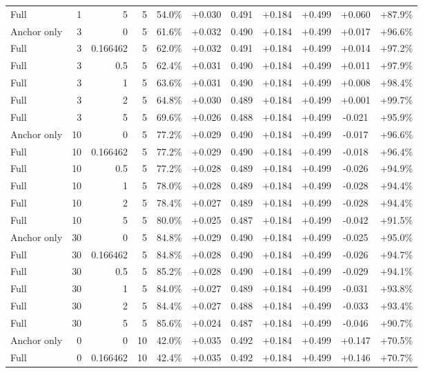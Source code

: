 \begin{table}[htbp]
\begin{tabular}{lrrrccccccc}
Full & 1 & 5 & 5 & 54.0\% & +0.030 & 0.491 & +0.184 & +0.499 & +0.060 & +87.9\% \\
Anchor only & 3 & 0 & 5 & 61.6\% & +0.032 & 0.490 & +0.184 & +0.499 & +0.017 & +96.6\% \\
Full & 3 & 0.166462 & 5 & 62.0\% & +0.032 & 0.491 & +0.184 & +0.499 & +0.014 & +97.2\% \\
Full & 3 & 0.5 & 5 & 62.4\% & +0.031 & 0.490 & +0.184 & +0.499 & +0.011 & +97.9\% \\
Full & 3 & 1 & 5 & 63.6\% & +0.031 & 0.490 & +0.184 & +0.499 & +0.008 & +98.4\% \\
Full & 3 & 2 & 5 & 64.8\% & +0.030 & 0.489 & +0.184 & +0.499 & +0.001 & +99.7\% \\
Full & 3 & 5 & 5 & 69.6\% & +0.026 & 0.488 & +0.184 & +0.499 & -0.021 & +95.9\% \\
Anchor only & 10 & 0 & 5 & 77.2\% & +0.029 & 0.490 & +0.184 & +0.499 & -0.017 & +96.6\% \\
Full & 10 & 0.166462 & 5 & 77.2\% & +0.029 & 0.490 & +0.184 & +0.499 & -0.018 & +96.4\% \\
Full & 10 & 0.5 & 5 & 77.2\% & +0.028 & 0.489 & +0.184 & +0.499 & -0.026 & +94.9\% \\
Full & 10 & 1 & 5 & 78.0\% & +0.028 & 0.489 & +0.184 & +0.499 & -0.028 & +94.4\% \\
Full & 10 & 2 & 5 & 78.4\% & +0.027 & 0.489 & +0.184 & +0.499 & -0.028 & +94.4\% \\
Full & 10 & 5 & 5 & 80.0\% & +0.025 & 0.487 & +0.184 & +0.499 & -0.042 & +91.5\% \\
Anchor only & 30 & 0 & 5 & 84.8\% & +0.029 & 0.490 & +0.184 & +0.499 & -0.025 & +95.0\% \\
Full & 30 & 0.166462 & 5 & 84.8\% & +0.028 & 0.490 & +0.184 & +0.499 & -0.026 & +94.7\% \\
Full & 30 & 0.5 & 5 & 85.2\% & +0.028 & 0.490 & +0.184 & +0.499 & -0.029 & +94.1\% \\
Full & 30 & 1 & 5 & 84.0\% & +0.027 & 0.489 & +0.184 & +0.499 & -0.031 & +93.8\% \\
Full & 30 & 2 & 5 & 84.4\% & +0.027 & 0.488 & +0.184 & +0.499 & -0.033 & +93.4\% \\
Full & 30 & 5 & 5 & 85.6\% & +0.024 & 0.487 & +0.184 & +0.499 & -0.046 & +90.7\% \\
Anchor only & 0 & 0 & 10 & 42.0\% & +0.035 & 0.492 & +0.184 & +0.499 & +0.147 & +70.5\% \\
Full & 0 & 0.166462 & 10 & 42.4\% & +0.035 & 0.492 & +0.184 & +0.499 & +0.146 & +70.7\% \\

\end{tabular}
\end{table}
